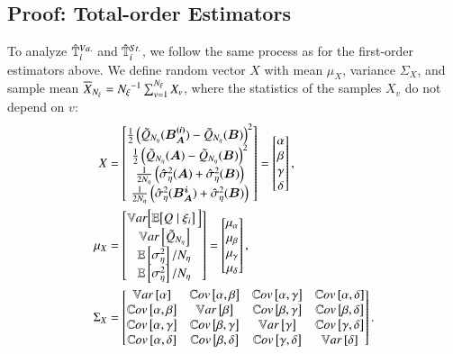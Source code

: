 \subsection{Proof: Total-order Estimators}
To analyze $\hat{\mathbb{T}}_{i}^{Va.}$ and $\hat{\mathbb{T}}_{i}^{St.}$, we follow the same process as for the first-order estimators above.
We define random vector $X$ with mean $\mu_X$, variance $\Sigma_X$, and sample mean $\overline{X}_{{N_\xi}} = {N_\xi}^{-1} \sum_{v=1}^{{N_\xi}} X_v$, where the statistics of the samples $X_v$ do not depend on $v$:
\begin{align} \label{m4eq:t-xmatrix}
    X &= \begin{bmatrix} \frac{1}{2} \left( \tilde{Q}_{{N_\eta}}(\bm{B_A^{(i)}}) - \tilde{Q}_{{N_\eta}}(\bm{B}) \right)^2 \\
                        \frac{1}{2} \left( \tilde{Q}_{{N_\eta}}(\bm{A}) - \tilde{Q}_{{N_\eta}}(\bm{B}) \right)^2 \\
                        \frac{1}{2{N_\eta}} \left( \hat{\sigma}^2_\eta(\bm{A}) + \hat{\sigma}^2_\eta(\bm{B}) \right) \\
                        \frac{1}{2{N_\eta}} \left( \hat{\sigma}^2_\eta(\bm{B_A^i}) + \hat{\sigma}^2_\eta(\bm{B}) \right)
        \end{bmatrix}
        = \begin{bmatrix} \alpha \\ \beta \\ \gamma \\ \delta \end{bmatrix}, \\
    \mu_X &= \begin{bmatrix} \mathbb{V}ar\Bigl[ \mathbb{E}\bigl[Q\mid\xi_i\bigr] \, {} \Bigr] \\ \mathbb{V}ar\left[\tilde{Q}_{{N_\eta}}\right] \\ \mathbb{E}\left[\sigma^2_\eta\right]/{N_\eta} \\ \mathbb{E}\left[\sigma^2_\eta\right]/{N_\eta} \end{bmatrix} 
        = \begin{bmatrix} \mu_\alpha \\ \mu_\beta \\ \mu_\gamma \\ \mu_\delta \end{bmatrix}, \\
    \Sigma_X &= \begin{bmatrix}
        \mathbb{V}ar\left[\alpha\right] & \mathbb{C}ov\left[\alpha,\beta\right] & \mathbb{C}ov\left[\alpha,\gamma\right] & \mathbb{C}ov\left[\alpha,\delta\right] \\ 
        \mathbb{C}ov\left[\alpha,\beta\right] & \mathbb{V}ar\left[\beta\right] & \mathbb{C}ov\left[\beta,\gamma\right] & \mathbb{C}ov\left[\beta,\delta\right] \\
        \mathbb{C}ov\left[\alpha,\gamma\right] & \mathbb{C}ov\left[\beta,\gamma\right] & \mathbb{V}ar\left[\gamma\right] & \mathbb{C}ov\left[\gamma,\delta\right] \\
        \mathbb{C}ov\left[\alpha,\delta\right] & \mathbb{C}ov\left[\beta,\delta\right] & \mathbb{C}ov\left[\gamma,\delta\right] & \mathbb{V}ar\left[\delta\right]
    \end{bmatrix} .
\end{align}

